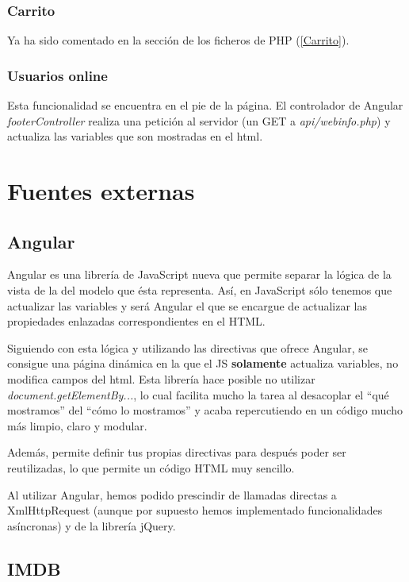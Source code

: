 \documentclass{apuntes}
\begin{document}
\subsubsection{Carrito}

Ya ha sido comentado en la sección de los ficheros de PHP  (\ref{Carrito}).

\subsubsection{Usuarios online}

Esta funcionalidad se encuentra en el pie de la página. El controlador de Angular \textit{footerController} realiza una petición al servidor (un GET a \textit{api/webinfo.php}) y actualiza las variables que son mostradas en el html.

\section{Fuentes externas}

\subsection{Angular}
\label{Angular}

Angular es una librería de JavaScript nueva que permite separar la lógica de la vista de la del modelo que ésta representa. Así, en JavaScript sólo tenemos que actualizar las variables y será Angular el que se encargue de actualizar las propiedades enlazadas correspondientes en el HTML.

Siguiendo con esta lógica y utilizando las directivas que ofrece Angular, se consigue una página dinámica en la que el JS \textbf{solamente} actualiza variables, no modifica campos del html. Esta librería hace posible no utilizar \textit{document.getElementBy...}, lo cual facilita mucho la tarea al desacoplar el ``qué mostramos'' del ``cómo lo mostramos'' y acaba repercutiendo en un código mucho más limpio, claro y modular.

Además, permite definir tus propias directivas para después poder ser reutilizadas, lo que permite un código HTML muy sencillo.


Al utilizar Angular, hemos podido prescindir de llamadas directas a XmlHttpRequest (aunque por supuesto hemos implementado funcionalidades asíncronas) y de la librería jQuery.

\subsection{IMDB}
\end{document}

